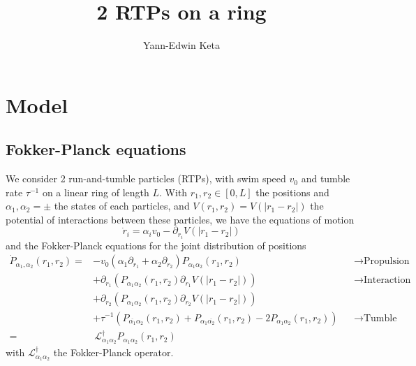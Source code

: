 \documentclass[pre,aps,superscriptaddress,nofootinbib]{revtex4}
\begin{document}
\title{2 RTPs on a ring}
\author{Yann-Edwin Keta}
\maketitle


\nocite{slowman2016jamming}

\section{Model}

\subsection{Fokker-Planck equations}

We consider 2 run-and-tumble particles (RTPs), with swim speed $v_0$ and tumble rate $\tau^{-1}$ on a linear ring of length $L$. With $r_1, r_2 \in [0, L]$ the positions and $\alpha_1, \alpha_2 = \pm$ the states of each particles, and $V(r_1, r_2) = V(|r_1 - r_2|)$ the potential of interactions between these particles, we have the equations of motion
\begin{equation}
\dot{r}_i = \alpha_i v_0 - \partial_{r_i} V(|r_1 - r_2|)
\label{EOM}
\end{equation}
and the Fokker-Planck equations for the joint distribution of positions
\begin{equation}
\begin{aligned}
\dot{P}_{\alpha_1, \alpha_2}(r_1, r_2) =
  &- v_0(\alpha_1 \partial_{r_1} + \alpha_2 \partial_{r_2}) P_{\alpha_1\alpha_2}(r_1, r_2)
    &&\to \text{Propulsion}\\
  &+ \partial_{r_1} (P_{\alpha_1\alpha_2}(r_1, r_2)\partial_{r_1}V(|r_1 - r_2|))
    &&\to \text{Interaction}\\
  &+ \partial_{r_2} (P_{\alpha_1\alpha_2}(r_1, r_2)\partial_{r_2}V(|r_1 - r_2|))
    &&\\
  &+ \tau^{-1} (P_{\overline{\alpha_1}\alpha_2}(r_1, r_2) + P_{\alpha_1\overline{\alpha_2}}(r_1, r_2) - 2 P_{\alpha_1\alpha_2}(r_1, r_2))
    &&\to \text{Tumble}\\
  =& \, \mathcal{L}^{\dagger}_{\alpha_1\alpha_2} P_{\alpha_1\alpha_2}(r_1, r_2)
\end{aligned}
\label{FP0}
\end{equation}
with $\mathcal{L}^{\dagger}_{\alpha_1\alpha_2}$ the Fokker-Planck operator.\\
\end{document}
